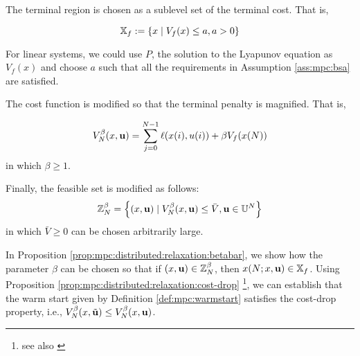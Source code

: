 The terminal region is chosen as a sublevel set of the terminal
cost. That is,

\begin{equation}
\label{eq:mpc:distributed:relaxation:Xfa}
\mathbb{X}_f := \left\lbrace x \mid V_f(x) \leq a, a > 0 \right\rbrace
\end{equation}

For linear systems, we could use $P$, the solution to the Lyapunov
equation as $V_f(x)$ and choose $a$ such that all the requirements in
Assumption \ref{ass:mpc:bsa} are satisfied.

The cost function is modified so that the terminal penalty is
magnified. That is,

\begin{equation}
\label{eq:mpc:distributed:relaxation:VNbeta}
V^\beta_N(x,\mathbf{u}) = \sum_{j=0}^{N-1} \ell(x(i),u(i)) + \beta V_f(x(N))
\end{equation}
in which $\beta \geq 1$.

Finally, the feasible set is modified as follows:
\begin{equation}
\label{eq:mpc:distributed:relaxation:ZNbeta}
\mathbb{Z}_N^\beta= \left\lbrace  (x,\mathbf{u}) \mid V_N^\beta(x,\mathbf{u}) \leq \bar{V}, \mathbf{u} \in
  \mathbb{U}^N \right\rbrace
\end{equation}
in which $\bar{V} \geq 0$  can be chosen arbitrarily large.

In Proposition \ref{prop:mpc:distributed:relaxation:betabar}, we show how the parameter $\beta$
can be chosen so that if $(x,\mathbf{u}) \in \mathbb{Z}_N^\beta$, then
$x(N;x,\mathbf{u}) \in \mathbb{X}_f$. Using  Proposition
\ref{prop:mpc:distributed:relaxation:cost-drop} \footnote{see also
  \citet[Exercise 2.11, Page 177]{rawlings:mayne:2009}}, we can establish that the
warm start given by Definition \ref{def:mpc:warmstart} satisfies the
cost-drop property, i.e., $V_N^\beta(x,\tilde{\mathbf{u}}) \leq
V_N^\beta(x,\mathbf{u})$. 

